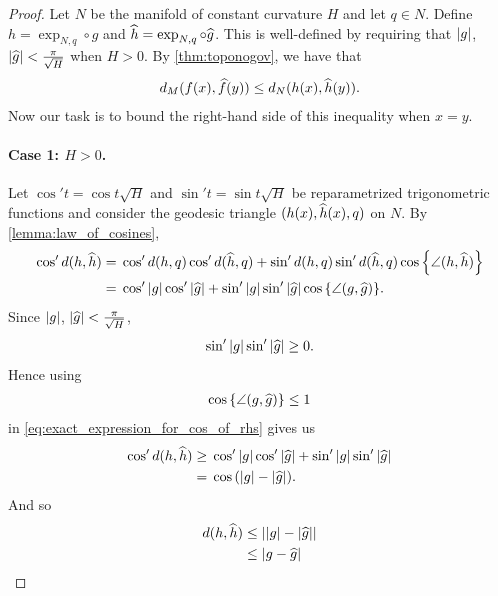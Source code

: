 \documentclass[english, a4paper, 12pt]{article}
\begin{document}
\begin{proof}
	Let $N$ be the manifold of constant curvature $H$ and let $q \in N$.
	Define $h = \operatorname{exp}_{N, q} \circ g$ and $\widehat{h} = \operatorname{exp}_{N, q} \circ \widehat{g}$.
	This is well-defined by requiring that $\abs{g}$, $\abs{\widehat{g}} < \frac{\pi}{\sqrt{H}}$ when $H > 0$.
	By \cref{thm:toponogov}, we have that
	\begin{align}
		d_M(f(x), \widehat{f}(y)) \leq d_N(h(x), \widehat{h}(y)).
	\end{align}
	Now our task is to bound the right-hand side of this inequality when $x = y$.

	\paragraph{Case 1: $H > 0$.}
	Let $\cos'{t} = \cos{t \sqrt{H}}$ and $\sin'{t} = \sin{t \sqrt{H}}$ be reparametrized trigonometric functions and consider the geodesic triangle $(h(x), \widehat{h}(x), q)$ on $N$.
	By \cref{lemma:law_of_cosines},
	\begin{align}
		\cos'{d(h, \mathhat{h})} ={}&
			\cos'{d(h, q)} \cos'{d(\mathhat{h}, q)}
			+ \sin'{d(h, q)} \sin'{d(\mathhat{h}, q)} \cos{\left\{ \angle(h, \mathhat{h}) \right\}}\\
		={}&
			\cos'{\abs{g}} \cos'{\abs{\mathhat{g}}}
			+ \sin'{\abs{g}} \sin'{\abs{\mathhat{g}}} \cos{\left\{ \angle(g, \mathhat{g}) \right\}}.%
		\label{eq:exact_expression_for_cos_of_rhs}
	\end{align}
	Since $\abs{g}$, $\abs{\widehat{g}} < \frac{\pi}{\sqrt{H}}$,
	\begin{align}
		\sin'{\abs{g}} \sin'{\abs{\widehat{g}}} \geq 0.
	\end{align}
	Hence using
	\begin{align}
		\cos{\left\{ \angle(g, \widehat{g}) \right\}} \leq 1
	\end{align}
	in \cref{eq:exact_expression_for_cos_of_rhs} gives us
	\begin{align}
		\cos'{d(h, \widehat{h})} \geq{}&
			\cos'{\abs{g}} \cos'{\abs{\widehat{g}}}
			+ \sin'{\abs{g}} \sin'{\abs{\widehat{g}}}\\
		={}& \cos{(\abs{g} - \abs{\widehat{g}})}.
	\end{align}
	And so
	\begin{align}
		d(h, \widehat{h}) \leq{}& \abs{\abs{g} - \abs{\widehat{g}}}\\
		\leq{}& \abs{g - \widehat{g}}
	\end{align}
	

\end{proof}
\end{document}
